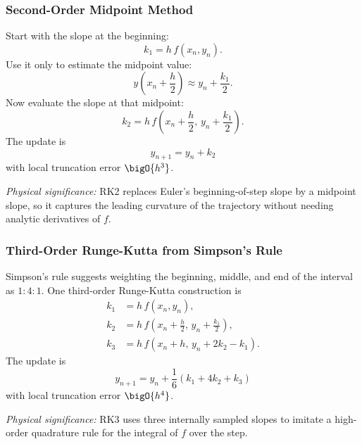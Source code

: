 \subsubsection{Second-Order Midpoint Method}
Start with the slope at the beginning:
\begin{equation}
    k_1=h\,f(x_n,y_n).
    \label{eq:lec06:rk2-k1}
\end{equation}
Use it only to estimate the midpoint value:
\begin{equation}
    y\left(x_n+\frac{h}{2}\right)
    \approx y_n+\frac{k_1}{2}.
    \label{eq:lec06:rk2-midpoint-estimate}
\end{equation}
Now evaluate the slope at that midpoint:
\begin{equation}
    k_2=h\,f\left(x_n+\frac{h}{2},\,y_n+\frac{k_1}{2}\right).
    \label{eq:lec06:rk2-k2}
\end{equation}
The update is
\begin{equation}
    \boxed{
    y_{n+1}=y_n+k_2}
    \label{eq:lec06:rk2-update}
\end{equation}
with local truncation error $\bigO{h^3}$.

\textit{Physical significance:} RK2 replaces Euler's beginning-of-step slope
by a midpoint slope, so it captures the leading curvature of the trajectory
without needing analytic derivatives of $f$.

\subsubsection{Third-Order Runge-Kutta from Simpson's Rule}
Simpson's rule suggests weighting the beginning, middle, and end of the
interval as $1:4:1$. One third-order Runge-Kutta construction is
\begin{align}
    k_1 &= h\,f(x_n,y_n),
    \label{eq:lec06:rk3-k1}\\
    k_2 &= h\,f\left(x_n+\frac{h}{2},\,y_n+\frac{k_1}{2}\right),
    \label{eq:lec06:rk3-k2}\\
    k_3 &= h\,f\left(x_n+h,\,y_n+2k_2-k_1\right).
    \label{eq:lec06:rk3-k3}
\end{align}
The update is
\begin{equation}
    \boxed{
    y_{n+1}=y_n+\frac{1}{6}\left(k_1+4k_2+k_3\right)}
    \label{eq:lec06:rk3-update}
\end{equation}
with local truncation error $\bigO{h^4}$.

\textit{Physical significance:} RK3 uses three internally sampled slopes to
imitate a high-order quadrature rule for the integral of $f$ over the step.

